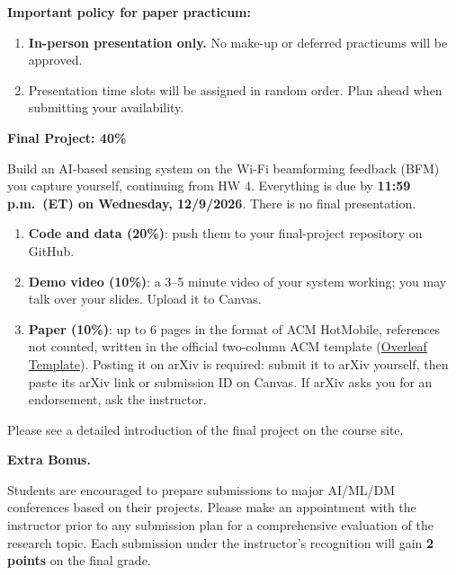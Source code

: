 \textbf{Important policy for paper practicum:}

\begin{enumerate}[label=(\arabic*), leftmargin=2em]
  \item \textbf{In-person presentation only.} No make-up or deferred practicums will be approved.
  \item Presentation time slots will be assigned in random order. Plan ahead when submitting your availability.
\end{enumerate}


\begin{outline} 
\1 \textbf{Final Project: 40\%}
\end{outline}

Build an AI-based sensing system on the Wi-Fi beamforming feedback (BFM) you capture yourself, continuing from HW 4. Everything is due by \textbf{11:59 p.m.\ (ET) on Wednesday, 12/9/2026}. There is no final presentation.

\begin{enumerate}[label=(\arabic*), leftmargin=2em]
	\item \textbf{Code and data (20\%)}: push them to your final-project repository on GitHub.

	\item \textbf{Demo video (10\%)}: a 3--5 minute video of your system working; you may talk over your slides. Upload it to Canvas.

	\item \textbf{Paper (10\%)}: up to 6 pages in the format of ACM HotMobile, references not counted, written in the official two-column ACM template (\href{https://www.overleaf.com/latex/templates/acm-conference-proceedings-primary-article-template/wbvnghjbzwpc}{Overleaf Template}). Posting it on arXiv is required: submit it to arXiv yourself, then paste its arXiv link or submission ID on Canvas. If arXiv asks you for an endorsement, ask the instructor.
\end{enumerate}

Please see a detailed introduction of the final project on the course site.

\textbf{Extra Bonus.}

Students are encouraged to prepare submissions to major AI/ML/DM conferences based on their projects. Please make an appointment with the instructor prior to any submission plan for a comprehensive evaluation of the research topic. Each submission under the instructor's recognition will gain \textbf{2 points} on the final grade.


